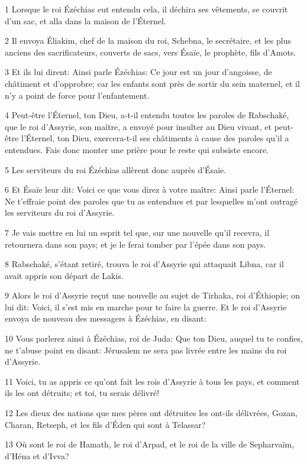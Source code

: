 \par 1 Lorsque le roi Ézéchias eut entendu cela, il déchira ses vêtements, se couvrit d'un sac, et alla dans la maison de l'Éternel.
\par 2 Il envoya Éliakim, chef de la maison du roi, Schebna, le secrétaire, et les plus anciens des sacrificateurs, couverts de sacs, vers Ésaïe, le prophète, fils d'Amots.
\par 3 Et ils lui dirent: Ainsi parle Ézéchias: Ce jour est un jour d'angoisse, de châtiment et d'opprobre; car les enfants sont près de sortir du sein maternel, et il n'y a point de force pour l'enfantement.
\par 4 Peut-être l'Éternel, ton Dieu, a-t-il entendu toutes les paroles de Rabschaké, que le roi d'Assyrie, son maître, a envoyé pour insulter au Dieu vivant, et peut-être l'Éternel, ton Dieu, exercera-t-il ses châtiments à cause des paroles qu'il a entendues. Fais donc monter une prière pour le reste qui subsiste encore.
\par 5 Les serviteurs du roi Ézéchias allèrent donc auprès d'Ésaïe.
\par 6 Et Ésaïe leur dit: Voici ce que vous direz à votre maître: Ainsi parle l'Éternel: Ne t'effraie point des paroles que tu as entendues et par lesquelles m'ont outragé les serviteurs du roi d'Assyrie.
\par 7 Je vais mettre en lui un esprit tel que, sur une nouvelle qu'il recevra, il retournera dans son pays; et je le ferai tomber par l'épée dans son pays.
\par 8 Rabschaké, s'étant retiré, trouva le roi d'Assyrie qui attaquait Libna, car il avait appris son départ de Lakis.
\par 9 Alors le roi d'Assyrie reçut une nouvelle au sujet de Tirhaka, roi d'Éthiopie; on lui dit: Voici, il s'est mis en marche pour te faire la guerre. Et le roi d'Assyrie envoya de nouveau des messagers à Ézéchias, en disant:
\par 10 Vous parlerez ainsi à Ézéchias, roi de Juda: Que ton Dieu, auquel tu te confies, ne t'abuse point en disant: Jérusalem ne sera pas livrée entre les mains du roi d'Assyrie.
\par 11 Voici, tu as appris ce qu'ont fait les rois d'Assyrie à tous les pays, et comment ils les ont détruits; et toi, tu serais délivré!
\par 12 Les dieux des nations que mes pères ont détruites les ont-ils délivrées, Gozan, Charan, Retseph, et les fils d'Éden qui sont à Telassar?
\par 13 Où sont le roi de Hamath, le roi d'Arpad, et le roi de la ville de Sepharvaïm, d'Héna et d'Ivva?
